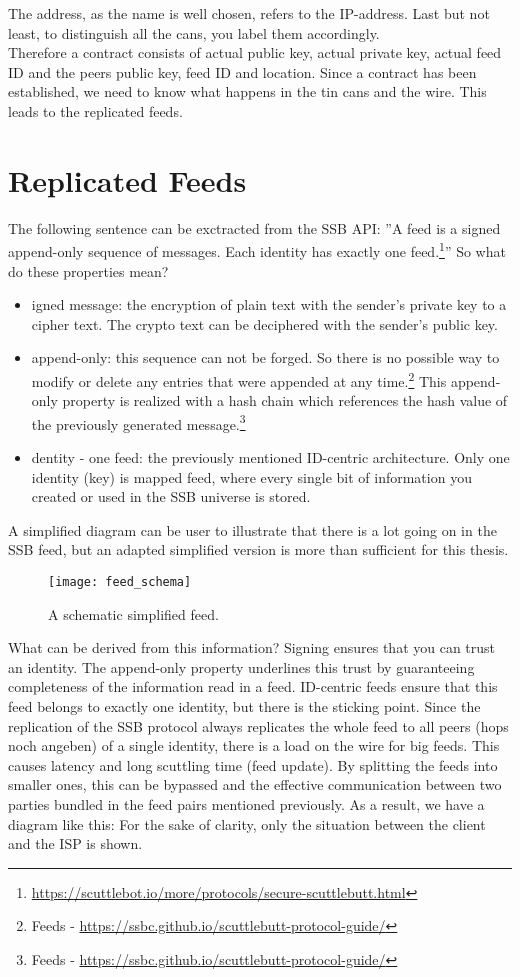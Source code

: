 The address, as the name is well chosen, refers to the IP-address. Last but not least, to distinguish all the cans, you label them accordingly. \\

Therefore a contract consists of actual public key, actual private key, actual feed ID and the peers public key, feed ID and location. Since a contract has been established, we need to know what happens in the tin cans and the wire. This leads to the replicated feeds.
\pagebreak

\section{Replicated Feeds}
The following sentence can be exctracted from the SSB API: ”A feed is a signed append-only sequence of messages. Each identity has exactly one feed.\footnote{\url{https://scuttlebot.io/more/protocols/secure-scuttlebutt.html}}” So what do these properties mean? 

\begin{itemize}
    \item igned message: the encryption of plain text with the sender’s private key to a cipher text. The crypto text can be deciphered with the sender’s public key. 
    \item append-only: this sequence can not be forged. So there is no possible way to modify or delete any entries that were appended at any time.\footnote{Feeds - \url{https://ssbc.github.io/scuttlebutt-protocol-guide/}} This append-only property is realized with a hash chain which references the hash value of the previously generated message.\footnote{Feeds - \url{https://ssbc.github.io/scuttlebutt-protocol-guide/}}
    \item dentity - one feed: the previously mentioned ID-centric architecture. Only one identity (key) is mapped feed, where every single bit of information you created or used in the SSB universe is stored. 
\end{itemize}
A simplified diagram can be user to illustrate that there is a lot going on in the SSB feed, but an adapted simplified version is more than sufficient for this thesis. 

\begin{figure}
    \centering
    \texttt{[image: feed\_schema]}
    \caption{A schematic simplified feed.}
    \label{fig:feed_schema}
\end{figure}
What can be derived from this information? Signing ensures that you can trust an identity. The append-only property underlines this trust by guaranteeing completeness of the information read in a feed. ID-centric feeds ensure that this feed belongs to exactly one identity, but there is the sticking point. Since the replication of the SSB protocol always replicates the whole feed to all peers (hops noch angeben) of a single identity, there is a load on the wire for big feeds. This causes latency and long scuttling time (feed update). By splitting the feeds into smaller ones, this can be bypassed and the effective communication between two parties bundled in the feed pairs mentioned previously. As a result, we have a diagram like this: For the sake of clarity, only the situation between the client and the ISP is shown. 

